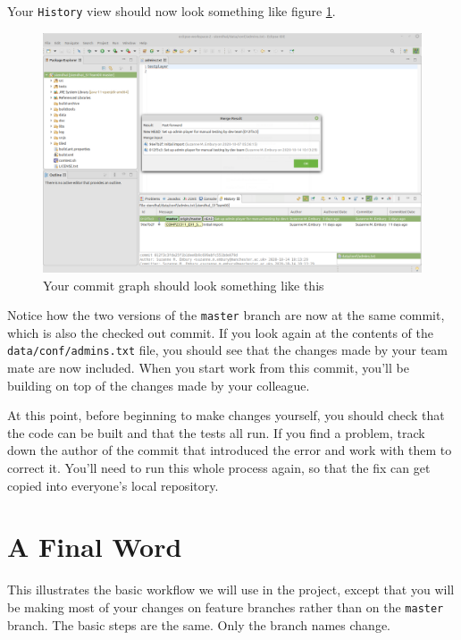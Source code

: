 \documentclass[
]{book}
\begin{document}
Your \texttt{History} view should now look something like figure \ref{fig:teamMatesLocalCommitGraphAfterFFMergeNoHistory-fig}.

\begin{figure}

{\centering \includegraphics[width=1\linewidth]{images/teamMatesLocalCommitGraphAfterFFMergeNoHistory} 

}

\caption{Your commit graph should look something like this}\label{fig:teamMatesLocalCommitGraphAfterFFMergeNoHistory-fig}
\end{figure}

Notice how the two versions of the \texttt{master} branch are now at the same commit, which is also the checked out commit. If you look again at the contents of the \texttt{data/conf/admins.txt} file, you should see that the changes made by your team mate are now included. When you start work from this commit, you'll be building on top of the changes made by your colleague.

At this point, before beginning to make changes yourself, you should check that the code can be built and that the tests all run. If you find a problem, track down the author of the commit that introduced the error and work with them to correct it. You'll need to run this whole process again, so that the fix can get copied into everyone's local repository.

\hypertarget{finalword}{%
\section{A Final Word}\label{finalword}}

This illustrates the basic workflow we will use in the project, except that you will be making most of your changes on feature branches rather than on the \texttt{master} branch. The basic steps are the same. Only the branch names change.
\end{document}
